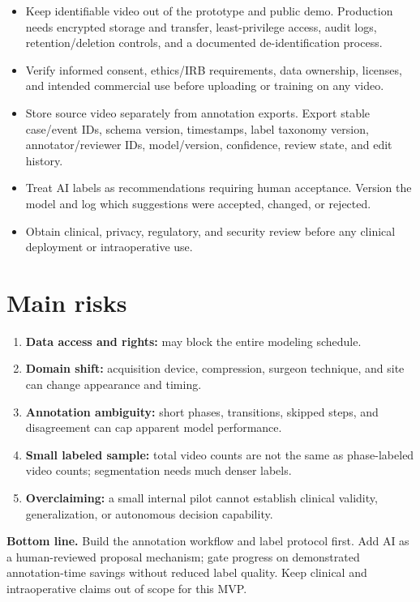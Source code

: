 \documentclass[11pt,a4paper]{article}
\newcommand{\riskbox}[1]{%
  \par\medskip\noindent
  \colorbox{pale}{\parbox{\dimexpr\linewidth-2\fboxsep\relax}{#1}}
  \par\medskip
}
\begin{document}
\begin{itemize}
  \item Keep identifiable video out of the prototype and public demo. Production needs encrypted storage and transfer, least-privilege access, audit logs, retention/deletion controls, and a documented de-identification process.
  \item Verify informed consent, ethics/IRB requirements, data ownership, licenses, and intended commercial use before uploading or training on any video.
  \item Store source video separately from annotation exports. Export stable case/event IDs, schema version, timestamps, label taxonomy version, annotator/reviewer IDs, model/version, confidence, review state, and edit history.
  \item Treat AI labels as recommendations requiring human acceptance. Version the model and log which suggestions were accepted, changed, or rejected.
  \item Obtain clinical, privacy, regulatory, and security review before any clinical deployment or intraoperative use.
\end{itemize}

\section{Main risks}

\begin{enumerate}
  \item \textbf{Data access and rights:} may block the entire modeling schedule.
  \item \textbf{Domain shift:} acquisition device, compression, surgeon technique, and site can change appearance and timing.
  \item \textbf{Annotation ambiguity:} short phases, transitions, skipped steps, and disagreement can cap apparent model performance.
  \item \textbf{Small labeled sample:} total video counts are not the same as phase-labeled video counts; segmentation needs much denser labels.
  \item \textbf{Overclaiming:} a small internal pilot cannot establish clinical validity, generalization, or autonomous decision capability.
\end{enumerate}

\riskbox{\textbf{Bottom line.} Build the annotation workflow and label protocol first. Add AI as a human-reviewed proposal mechanism; gate progress on demonstrated annotation-time savings without reduced label quality. Keep clinical and intraoperative claims out of scope for this MVP.}
\end{document}
